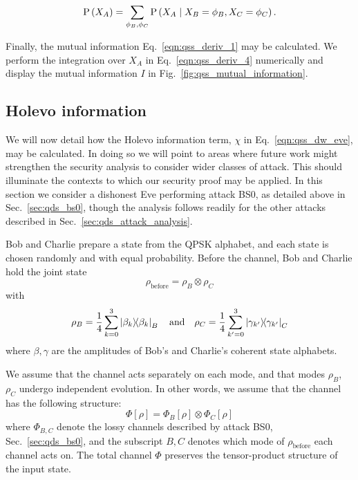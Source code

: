 \begin{equation}\label{eqn:qss_deriv_pxa}
\text{P}\left(X_A\right) = \sum_{\phi_B, \phi_C} \text{P}\left(X_A \; \middle| \; X_B=\phi_B, X_C=\phi_C\right).
\end{equation}


Finally, the mutual information Eq.~\ref{eqn:qss_deriv_1} may be calculated. We perform the integration over $X_A$ in Eq.~\ref{eqn:qss_deriv_4} numerically and display the mutual information $I$ in Fig.~\ref{fig:qss_mutual_information}.


\subsection{Holevo information}

We will now detail how the Holevo information term, $\chi$ in Eq.~\ref{eqn:qss_dw_eve}, may be calculated. In doing so we will point to areas where future work might strengthen the security analysis to consider wider classes of attack. This should illuminate the contexts to which our security proof may be applied. In this section we consider a dishonest Eve performing attack BS$0$, as detailed above in Sec.~\ref{sec:qds_bs0}, though the analysis follows readily for the other attacks described in Sec.~\ref{sec:qds_attack_analysis}. %

Bob and Charlie prepare a state from the QPSK alphabet, and each state is chosen randomly and with equal probability. Before the channel, Bob and Charlie hold the joint state
\begin{equation}
\rho_{\text{before}} = \rho_B \otimes \rho_C
\end{equation}
with
\begin{equation}\label{eqn:qss_initial_states}
\rho_B = \frac{1}{4} \sum_{k=0}^3 \dyad{\beta_k}_B \qq{and} \rho_C = \frac{1}{4} \sum_{k^\prime = 0}^3 \dyad{\gamma_{k^\prime}}_C
\end{equation}
where $\beta, \gamma$ are the amplitudes of Bob's and Charlie's coherent state alphabets.

We assume that the channel acts separately on each mode, and that modes $\rho_B$, $\rho_C$ undergo independent evolution. In other words, we assume that the channel has the following structure:
\begin{equation}\label{eqn:qss_channel}
\Phi\left[\rho\right] = \Phi_B\left[\rho\right] \otimes \Phi_C\left[\rho\right]
\end{equation}
where $\Phi_{B, C}$ denote the lossy channels described by attack BS$0$, Sec.~\ref{sec:qds_bs0}, and the subscript $B, C$ denotes which mode of $\rho_{\text{before}}$ each channel acts on. The total channel $\Phi$ preserves the tensor-product structure of the input state.

